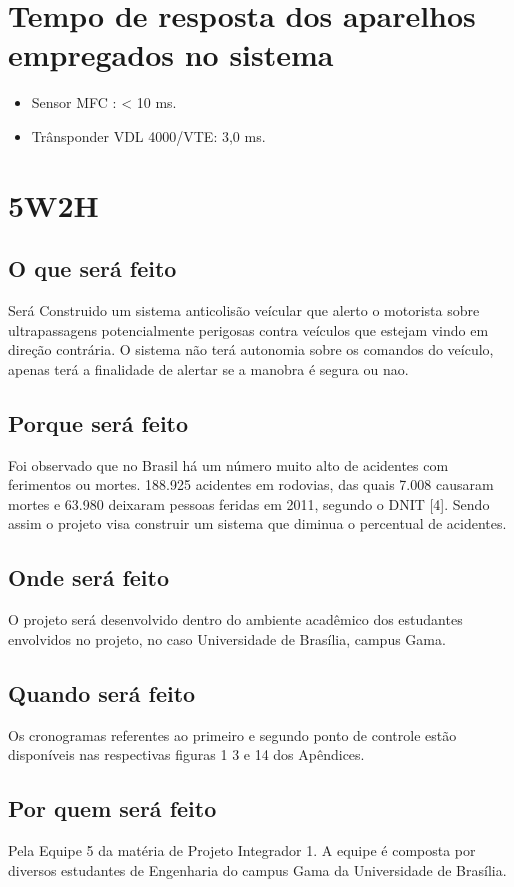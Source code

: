 \section{Tempo de resposta dos aparelhos empregados no sistema}
\begin{itemize}
  \item Sensor MFC \cite{mfc} : < 10 ms.
  \item Trânsponder VDL 4000/VTE: 3,0 ms.
\end{itemize}

\section {5W2H}

\subsection{O que será feito}
Será Construido um sistema anticolisão veícular que alerto o motorista sobre ultrapassagens potencialmente
perigosas contra veículos que estejam vindo em direção contrária. O sistema não terá autonomia sobre os
comandos do veículo, apenas terá a finalidade de alertar se a manobra é segura ou nao.

\subsection{Porque será feito}
Foi observado que no Brasil há um número muito alto de acidentes com ferimentos ou mortes. 188.925
 acidentes em rodovias, das quais 7.008 causaram mortes e 63.980 deixaram pessoas feridas em 2011,
 segundo o DNIT [4]. Sendo assim o projeto visa construir um sistema que diminua o percentual de acidentes.

\subsection{Onde será feito}
O projeto será desenvolvido dentro do ambiente acadêmico dos estudantes envolvidos no projeto, no caso
Universidade de Brasília, campus Gama.

\subsection{Quando será feito}
Os cronogramas referentes ao primeiro e segundo ponto de controle estão disponíveis nas respectivas figuras 1
3 e 14 dos Apêndices.

\subsection{Por quem será feito}
Pela Equipe 5 da matéria de Projeto Integrador 1.
A equipe é composta por diversos estudantes de Engenharia do campus Gama da Universidade de Brasília.


